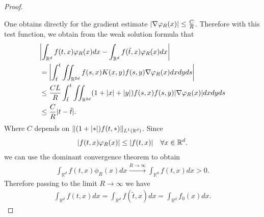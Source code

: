 \begin{proof}
\begin{figure}[H]
\begin{center}
   \end{center}
 \end{figure}
 One obtains directly for the gradient estimate $\lvert\nabla \varphi_R(x)\rvert \le  \frac{C}{R}$. Therefore with this
 test function, we obtain from the weak solution formula that 
 \begin{align*}
   &\abs*{\int_{\mathbb{R}^{d} }f(t,x)\phi_R(x)dx - \int_{\mathbb{R}^{d} } f(\tilde{t},x )\phi_R(x) dx}\\
    &= \abs*{\int_{\tilde{t} }^{t}\iint_{\mathbb{R}^{2d} }f(s,x)K(x,y)f(s,y)\nabla \phi_R(x)dxdyds }\\
                                                                                                       &\le \frac{CL}{R}  \int_{\tilde{t} }^{t}\iint_{\mathbb{R}^{2d} } (1+\abs{x} + \abs{y})f(s,x)f(s,y) \abs{\nabla \phi_R(x)} dx dy ds \\
                                                                                                       &\le  \frac{C}{R}\abs{t - \tilde{t}}
 .\end{align*}
 Where $C$ depends on $\|(1+\lvert*\rvert)f(t,*)\|_{L^{1}(\mathbb{R}^{d} ) }$. Since 
 \begin{align*}
  \lvert f(t,x)\varphi_R(x)\rvert\le \lvert f(t,x)\rvert \quad \forall  x \in  \mathbb{R}^{d} 
 .\end{align*}
 we can use the dominant convergence theorem to obtain 
 \begin{align*}
   \int_{\mathbb{R}^{d} } f(t,x)\phi_R(x) dx \xrightarrow{R\to \infty} \int_{\mathbb{R}^{d} }f(t,x) dx >0
 .\end{align*}
 Therefore passing to the limit $R \to \infty$ we have 
 \begin{align*}
   \int_{\mathbb{R}^{d} } f(t,x) dx =  \int_{\mathbb{R}^{d} } f(\tilde t,x) dx=\int_{\mathbb{R}^{d} }f_0(x) dx
 .\end{align*}
\end{proof}
